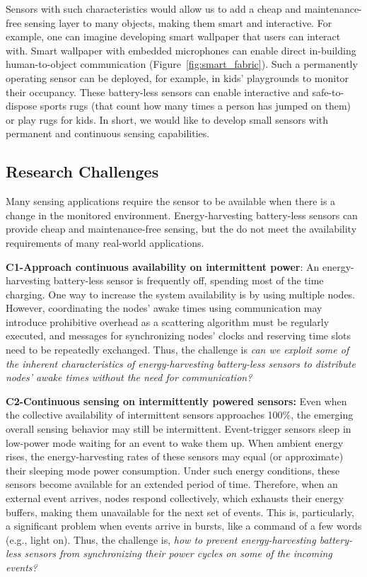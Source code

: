 Sensors with such characteristics would allow us to add a cheap and maintenance-free sensing layer to many objects, making them smart and interactive. For example, one can imagine developing smart wallpaper that users can interact with. 
Smart wallpaper with embedded microphones can enable direct in-building human-to-object communication (Figure~\ref{fig:smart_fabric}). Such a permanently operating sensor can be deployed, for example, in kids' playgrounds to monitor their occupancy. These battery-less sensors can enable
interactive and safe-to-dispose sports rugs (that count how many times a person has jumped on them) or play rugs for kids.
In short, we would like to develop small sensors with permanent and continuous sensing capabilities.  
%
\subsection{Research Challenges}
Many sensing applications require the sensor to be available when there is a change in the monitored environment.
Energy-harvesting battery-less sensors can provide cheap and maintenance-free sensing, but the do not meet the availability requirements of many real-world applications. 

\noindent\textbf{C1-Approach continuous availability on intermittent power}: 
An energy-harvesting battery-less sensor is frequently off, spending most of the time charging. 
One way to increase the system availability is by using multiple nodes.
However, coordinating the nodes' awake times using communication may introduce prohibitive overhead as a scattering algorithm must be regularly executed, and messages for synchronizing nodes' clocks and reserving time slots need to be repeatedly exchanged.
Thus, the challenge is \emph{can we exploit some of the inherent characteristics of energy-harvesting battery-less sensors to distribute nodes' awake times without the need for communication?}

\noindent\textbf{C2-Continuous sensing on intermittently powered sensors:}  
Even when the collective availability of intermittent sensors approaches 100\%, the emerging overall sensing behavior may still be intermittent. 
Event-trigger sensors sleep in low-power mode waiting for an event to wake them up. 
When ambient energy rises, the energy-harvesting rates of these sensors may equal (or approximate) their sleeping mode power consumption.
Under such energy conditions, these sensors become available for an extended period of time. 
Therefore, when an external event arrives, nodes respond collectively, which exhausts their energy buffers, making them unavailable for the next set of events. 
This is, particularly, a significant problem when events arrive in bursts, like a command of a few words (e.g., light on). 
Thus, the challenge is, \emph{how to prevent energy-harvesting battery-less sensors from synchronizing their power cycles on some of the incoming events?}

